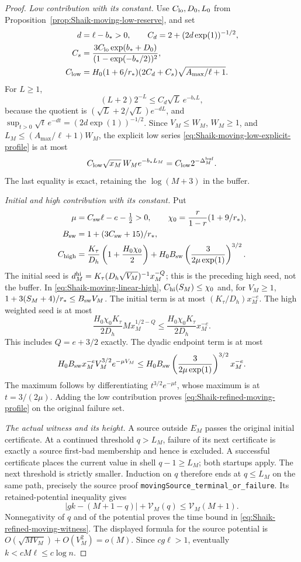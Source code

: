 \begin{proof}
\emph{Low contribution with its constant.}
Use \(C_{\rm lo},D_0,L_0\) from
Proposition~\ref{prop:Shaik-moving-low-reserve}, and set
\[
 \begin{split}
 d&=\ell-b_*>0,\qquad
 C_d=2+(2d\exp(1))^{-1/2},\\
 C_s&=\frac{3C_{\rm lo}\exp(b_*+D_0)}
                        {(1-\exp(-b_*/2))^2},\\
 C_{\rm low}
   &=H_0(1+6/r_*)(2C_d+C_s)\sqrt{A_{\max}/\ell+1}.
 \end{split}
\]
For \(L\ge1\),
\[
 (L+2)2^{-L}\le C_d\sqrt L\,e^{-b_*L},
\]
because the quotient is
\((\sqrt L+2/\sqrt L)e^{-dL}\), and
\(\sup_{t>0}\sqrt t\,e^{-dt}=(2d\exp(1))^{-1/2}\).
Since \(V_M\le W_M\), \(W_M\ge1\), and
\(L_M\le(A_{\max}/\ell+1)W_M\), the explicit low series
\eqref{eq:Shaik-moving-low-explicit-profile} is at most
\[
 C_{\rm low}\sqrt{x_M}\,W_M e^{-b_*L_M}
                  =C_{\rm low}2^{-\Delta_M^{\rm buf}}.
\]
The last equality is exact, retaining the \(\log(M+3)\) in the buffer.

\emph{Initial and high contribution with its constant.}
Put
\[
 \begin{split}
 \mu&=C_{\rm sw}\ell-e-\tfrac12>0,\qquad
 \chi_0=\frac r{1-r}(1+9/r_*),\\
 B_{\rm sw}&=1+(3C_{\rm sw}+15)/r_*,\\
 C_{\rm high}
   &=\frac{K_\tau}{D_h}
       \left(1+\frac{H_0\chi_0}{2}\right)
       +H_0B_{\rm sw}
             \left(\frac{3}{2\mu\exp(1)}\right)^{3/2}.
 \end{split}
\]
The initial seed is
\(d_M^{\rm hi}=K_\tau(D_h\sqrt{V_M})^{-1}x_M^{-Q}\);
this is the preceding high seed, not the buffer.
In \eqref{eq:Shaik-moving-linear-high},
\(C_{\rm hi}(S_M)\le\chi_0\) and, for \(V_M\ge1\),
\(1+3(S_M+4)/r_*\le B_{\rm sw}V_M\).
The initial term is at most \((K_\tau/D_h)x_M^{-e}\).
The high weighted seed is at most
\[
 \frac{H_0\chi_0K_\tau}{2D_h}
 M x_M^{1/2-Q}\le
 \frac{H_0\chi_0K_\tau}{2D_h}x_M^{-e}.
\]
This includes \(Q=e+3/2\) exactly. The dyadic endpoint term is at most
\[
 H_0B_{\rm sw}x_M^{-e}V_M^{3/2}e^{-\mu V_M}
 \le H_0B_{\rm sw}
        \left(\frac3{2\mu\exp(1)}\right)^{3/2}x_M^{-e}.
\]
The maximum follows by differentiating
\(t^{3/2}e^{-\mu t}\), whose maximum is at \(t=3/(2\mu)\).
Adding the low contribution proves
\eqref{eq:Shaik-refined-moving-profile} on the original failure set.

\emph{The actual witness and its height.}
A source outside \(E_M\) passes the original initial certificate.
At a continued threshold \(q>L_M\), failure of its next certificate
is exactly a source first-bad membership and hence is excluded.
A successful certificate places the current value in shell
\(q-1\ge L_M\); both startups apply. The next threshold is strictly
smaller. Induction on \(q\) therefore ends at \(q\le L_M\) on the
same path, precisely the source proof
\texttt{movingSource\_terminal\_or\_failure}.
Its retained-potential inequality gives
\[
 |gk-(M+1-q)|+\mathcal V_M(q)\le\mathcal V_M(M+1).
\]
Nonnegativity of \(q\) and of the potential proves the time bound in
\eqref{eq:Shaik-refined-moving-witness}. The displayed formula for the
source potential is \(O(\sqrt{MV_M})+O(V_M^2)=o(M)\).
Since \(cg\ell>1\), eventually \(k<cM\ell\le c\log n\).


\end{proof}
